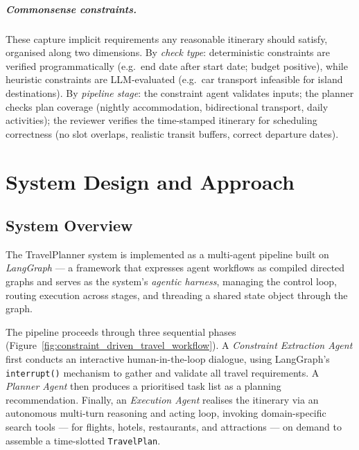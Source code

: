 \documentclass[a4paper,oneside,bibliography=totoc]{scrbook}
\begin{document}
\paragraph{Commonsense constraints.}
These capture implicit requirements any reasonable itinerary should satisfy,
organised along two dimensions. By \emph{check type}: deterministic
constraints are verified programmatically (e.g.\ end date after start date;
budget positive), while heuristic constraints are LLM-evaluated (e.g.\ car
transport infeasible for island destinations). By \emph{pipeline stage}: the
constraint agent validates inputs; the planner checks plan coverage (nightly
accommodation, bidirectional transport, daily activities); the reviewer
verifies the time-stamped itinerary for scheduling correctness (no slot
overlaps, realistic transit buffers, correct departure dates).

\chapter{System Design and Approach}
\label{sec:system}


\section{System Overview}
\label{Overview}
The TravelPlanner system is implemented as a multi-agent pipeline built on
\emph{LangGraph} --- a framework that expresses agent workflows as compiled
directed graphs and serves as the system's \emph{agentic harness}, managing
the control loop, routing execution across stages, and threading a shared
state object through the graph.

The pipeline proceeds through three sequential phases
(Figure~\ref{fig:constraint_driven_travel_workflow}). A \emph{Constraint
Extraction Agent} first conducts an interactive human-in-the-loop dialogue,
using LangGraph's \texttt{interrupt()} mechanism to gather and validate all
travel requirements. A \emph{Planner Agent} then produces a prioritised task
list as a planning recommendation. Finally, an \emph{Execution Agent} realises
the itinerary via an autonomous multi-turn reasoning and acting loop, invoking
domain-specific search tools --- for flights, hotels, restaurants, and
attractions --- on demand to assemble a time-slotted \texttt{TravelPlan}.
\end{document}
